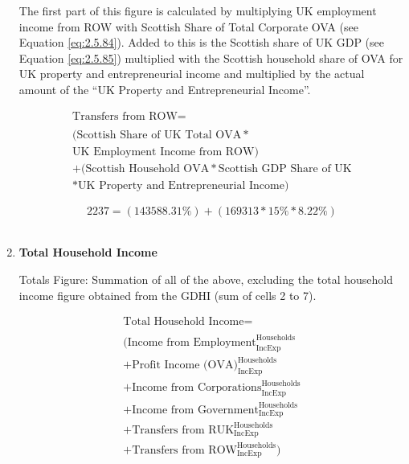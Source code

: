\begin{enumerate}
The first part of this figure is calculated by multiplying UK employment income from ROW \cite{ONS2011c} with Scottish Share of Total Corporate OVA (see Equation \ref{eq:2.5.84}). Added to this is the Scottish share of UK GDP (see Equation \ref{eq:2.5.85}) multiplied with the Scottish household share of OVA for UK property and entrepreneurial income and multiplied by the actual amount of the ``UK Property and Entrepreneurial Income''. \cite{ScotGov2013a,ScotGov2013b}

\begin{equation}
\begin{split}
\text{Transfers from ROW} =  \\ \\
(\text{Scottish Share of UK Total OVA}*\\
\text{UK Employment Income from ROW})\\
+(\text{Scottish Household OVA}*\text{Scottish GDP Share of UK}\\
*\text{UK Property and Entrepreneurial Income})
\end{split} \label{eq:2.5.11}
\end{equation}


\begin{equation} \nonumber
2237 = (143588.31\%)+(169313*15\%*8.22\%)
\end{equation}\\

\item \textbf {Total Household Income}

Totals Figure: Summation of all of the above, excluding the total household income figure obtained from the GDHI (sum of cells 2 to 7).

\begin{equation}
\begin{split}
\text{Total Household Income} =  \\ \\
(\text{Income from Employment}^\text{Households}_\text{IncExp}\\
+\text{Profit Income (OVA)}^\text{Households}_\text{IncExp}\\
+\text{Income from Corporations}^\text{Households}_\text{IncExp}\\
+\text{Income from Government}^\text{Households}_\text{IncExp}\\
+\text{Transfers from RUK}^\text{Households}_\text{IncExp}\\
+\text{Transfers from ROW}^\text{Households}_\text{IncExp})
\end{split} \label{eq:2.5.12}
\end{equation}


\end{enumerate}
